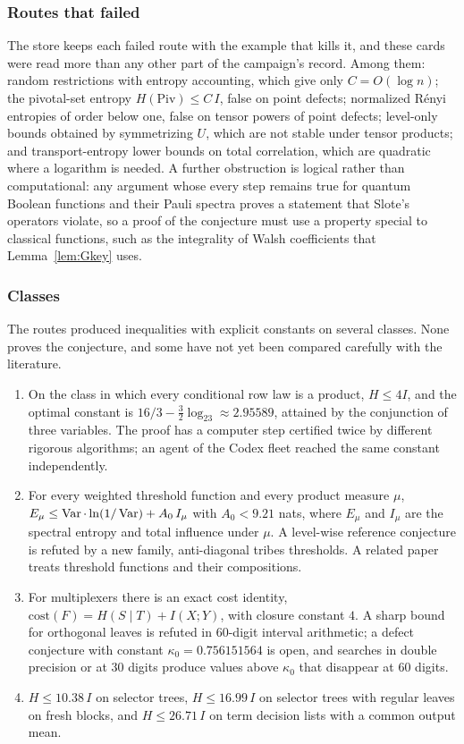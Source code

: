 \subsubsection*{Routes that failed}
The store keeps each failed route with the example that kills it, and these cards were read more than any other part of the campaign's record. Among them: random restrictions with entropy accounting, which give only $C=O(\log n)$; the pivotal-set entropy $H(\mathrm{Piv})\le C\,I$, false on point defects; normalized R\'enyi entropies of order below one, false on tensor powers of point defects; level-only bounds obtained by symmetrizing $U$, which are not stable under tensor products; and transport-entropy lower bounds on total correlation, which are quadratic where a logarithm is needed. A further obstruction is logical rather than computational: any argument whose every step remains true for quantum Boolean functions and their Pauli spectra proves a statement that Slote's operators violate, so a proof of the conjecture must use a property special to classical functions, such as the integrality of Walsh coefficients that Lemma~\ref{lem:Gkey} uses.

\subsubsection*{Classes}
The routes produced inequalities with explicit constants on several classes. None proves the conjecture, and some have not yet been compared carefully with the literature.
\begin{enumerate}[label=(\roman*)]
\item On the class in which every conditional row law is a product, $H\le4I$, and the optimal constant is $16/3-\frac32\log_23\approx2.95589$, attained by the conjunction of three variables. The proof has a computer step certified twice by different rigorous algorithms; an agent of the Codex fleet reached the same constant independently.
\item For every weighted threshold function and every product measure $\mu$, $E_\mu\le\operatorname{Var}\cdot\ln(1/\operatorname{Var})+A_0\,I_\mu$ with $A_0<9.21$ nats, where $E_\mu$ and $I_\mu$ are the spectral entropy and total influence under $\mu$. A level-wise reference conjecture is refuted by a new family, anti-diagonal tribes thresholds. A related paper treats threshold functions and their compositions.
\item For multiplexers there is an exact cost identity, $\mathrm{cost}(F)=H(S\mid T)+I(X;Y)$, with closure constant $4$. A sharp bound for orthogonal leaves is refuted in $60$-digit interval arithmetic; a defect conjecture with constant $\kappa_0=0.756151564$ is open, and searches in double precision or at $30$ digits produce values above $\kappa_0$ that disappear at $60$ digits.
\item $H\le10.38\,I$ on selector trees, $H\le16.99\,I$ on selector trees with regular leaves on fresh blocks, and $H\le26.71\,I$ on term decision lists with a common output mean.
\end{enumerate}

